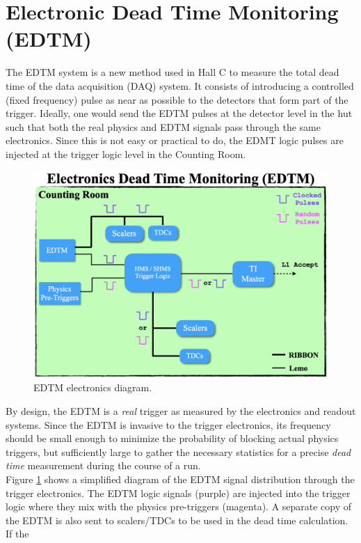 \documentclass[11pt]{article}
\begin{document}
\section{Electronic Dead Time Monitoring (EDTM)}\label{sec:edtm}
\noindent The EDTM system is a new method used in Hall C to measure the total dead time of the data acquisition (DAQ) system. It consists of introducing a controlled (fixed frequency) pulse
as near as possible to the detectors that form part of the trigger. Ideally, one would send the EDTM pulses at the detector level in the hut such that both the real physics and EDTM signals
pass through the same electronics. Since this is not easy or practical to do, the EDMT logic pulses are injected at the trigger logic level in the Counting Room.\\
\begin{figure}[H]
  \centering
  \includegraphics[scale=0.54]{images/EDTM_diagram.png}
  \caption{EDTM electronics diagram.}
  \label{fig:EDTM_diagram}
\end{figure}
\indent By design, the EDTM is a \textit{real} trigger as measured by the electronics and readout systems. Since the EDTM is invasive to the trigger electronics, its frequency should be small
enough to minimize the probability of blocking actual physics triggers, but sufficiently large to gather the necessary statistics for a precise \textit{dead time} measurement during the course of a run. \\
\indent Figure \ref{fig:EDTM_diagram} shows a simplified diagram of the EDTM signal distribution through the trigger electronics. The EDTM logic signals (purple) are injected into the trigger logic
where they mix with the physics pre-triggers (magenta). A separate copy of the EDTM is also sent to scalers/TDCs to be used in the dead time calculation. If the
\end{document}
